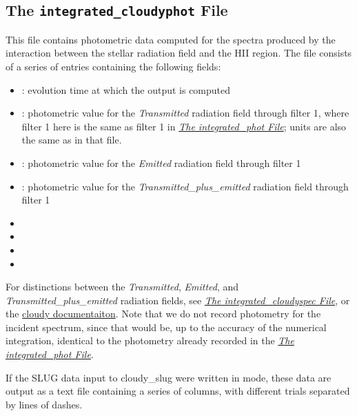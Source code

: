 \documentclass[letterpaper,10pt,english]{sphinxmanual}
\begin{document}
\subsection{The \texttt{integrated\_cloudyphot} File}
\label{cloudy:the-integrated-cloudyphot-file}
This file contains photometric data computed for the spectra produced
by the interaction between the stellar radiation field and the HII
region. The file consists of a series of entries containing the
following fields:
\begin{itemize}
\item {} 
: evolution time at which the output is computed

\item {} 
: photometric value for the \emph{Transmitted}
radiation field through filter 1, where filter 1 here is the same as
filter 1 in {\hyperref[output:ssec-int-phot-file]{\emph{The integrated\_phot File}}}; units are also the same as
in that file.

\item {} 
: photometric value for the \emph{Emitted}
radiation field through filter 1

\item {} 
: photometric value for the
\emph{Transmitted\_plus\_emitted} radiation field through filter 1

\item {} 

\item {} 

\item {} 

\item {} 

\end{itemize}

For distinctions between the \emph{Transmitted}, \emph{Emitted}, and
\emph{Transmitted\_plus\_emitted} radiation fields, see
{\hyperref[cloudy:sssec-int-cloudyspec-file]{\emph{The integrated\_cloudyspec File}}}, or the \href{http://nublado.org}{cloudy documentaiton}. Note that we do not record photometry for the
incident spectrum, since that would be, up to the accuracy of the
numerical integration, identical to the photometry already recorded in
the {\hyperref[output:ssec-int-phot-file]{\emph{The integrated\_phot File}}}.

If the SLUG data input to cloudy\_slug were written in  mode,
these data are output as a text file containing a series of columns,
with different trials separated by lines of dashes.
\end{document}
